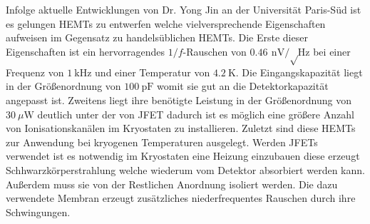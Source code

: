 Infolge aktuelle Entwicklungen von Dr. Yong Jin an der Universität Paris-Süd ist es gelungen HEMTs zu entwerfen welche vielversprechende Eigenschaften aufweisen im Gegensatz zu handelsüblichen HEMTs.
Die Erste dieser Eigenschaften ist ein hervorragendes $1/f$-Rauschen von $\SI{0.46}{\nano\volt\per\sqrt\hertz}$ bei einer Frequenz von $\SI{1}{\kilo\hertz}$ und einer Temperatur von $\SI{4.2}{\kelvin}$.
Die Eingangskapazität liegt in der Größenordnung von $\SI{100}{\pico\farad}$ womit sie gut an die Detektorkapazität angepasst ist.
Zweitens liegt ihre benötigte Leistung in der Größenordnung von $\SI{30}{\mu\watt}$ deutlich unter der von JFET dadurch ist es möglich eine größere Anzahl von Ionisationskanälen im Kryostaten zu installieren.
Zuletzt sind diese HEMTs zur Anwendung bei kryogenen Temperaturen ausgelegt.
Werden JFETs verwendet ist es notwendig im Kryostaten eine Heizung einzubauen diese erzeugt Schhwarzkörperstrahlung welche wiederum vom Detektor absorbiert werden kann.
Außerdem muss sie von der Restlichen Anordnung isoliert werden. %
Die dazu verwendete Membran erzeugt zusätzliches niederfrequentes Rauschen durch ihre Schwingungen.\cite{HEMTYang2011, Jin2014}




